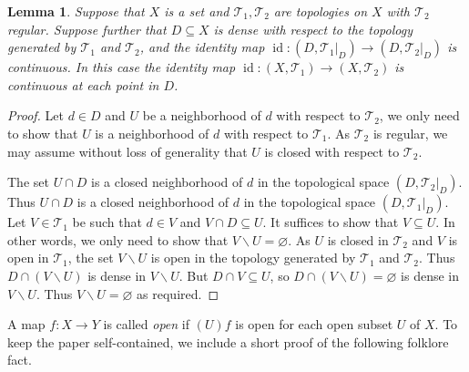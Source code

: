 \documentclass[11pt]{amsart}
\newtheorem{theorem}{Theorem}[section]
\newtheorem{lemma}[theorem]{Lemma}
\theoremstyle{definition}
\newcommand{\Tau}{\mathcal T}
\newcommand{\id}{\operatorname{id}}
\begin{document}
\begin{lemma}\label{lem:dense_cont_points}
Suppose that \(X\) is a set and \(\Tau_1, \Tau_2\) are topologies on \(X\) with \(\Tau_2\) regular. Suppose further that \(D\subseteq X\) is dense with respect to the topology generated by \(\Tau_1\) and \(\Tau_2\), and the identity map \(\id:(D, \Tau_1|_D)\to (D, \Tau_2|_D)\) is continuous.
In this case the identity map \(\id:(X, \Tau_1)\to (X, \Tau_2)\) is continuous at each point in \(D\).
\end{lemma}
\begin{proof}
    Let \(d\in D\) and \(U\) be a neighborhood of \(d\) with respect to \(\Tau_2\), we only need to show that \(U\) is a neighborhood of \(d\) with respect to \(\Tau_1\).
    As \(\Tau_2\) is regular, we may assume without loss of generality that \(U\) is closed with respect to \(\Tau_2\).

    The set \(U\cap D\) is a closed neighborhood of \(d\) in the topological space \((D, \Tau_2|_D)\). Thus \(U\cap D\) is a closed neighborhood of \(d\) in the topological space \((D, \Tau_1|_D)\). Let \(V\in \Tau_1\) be such that \(d\in V\) and \(V\cap D\subseteq U\). It suffices to show that \(V\subseteq U\).
    In other words, we only need to show that \(V\backslash U=\varnothing\). As \(U\) is closed in \(\Tau_2\) and \(V\) is open in \(\Tau_1\), the set \(V\backslash U\) is open in the topology generated by \(\Tau_1\) and \(\Tau_2\). Thus \(D\cap (V\backslash U)\) is dense in \(V\backslash U\). But \(D\cap V\subseteq U\), so \(D\cap (V\backslash U)=\varnothing\) is dense in \(V\backslash U\). Thus \(V\backslash U = \varnothing\) as required. 
\end{proof}
A map $f: X\rightarrow Y$ is called {\em open} if $(U)f$ is open for each open subset $U$ of $X$. To keep the paper self-contained, we include a short proof of the following folklore fact.
\end{document}
